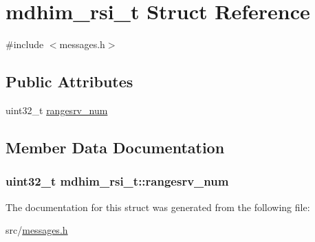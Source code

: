 \hypertarget{structmdhim__rsi__t}{\section{mdhim\-\_\-rsi\-\_\-t Struct Reference}
\label{df/dcf/structmdhim__rsi__t}
}


{\ttfamily \#include $<$messages.\-h$>$}

\subsection*{Public Attributes}
\begin{DoxyCompactItemize}
\item 
uint32\-\_\-t \hyperlink{structmdhim__rsi__t_accbcc2a99c8184df0649f04c01f60baf}{rangesrv\-\_\-num}
\end{DoxyCompactItemize}


\subsection{Member Data Documentation}
\hypertarget{structmdhim__rsi__t_accbcc2a99c8184df0649f04c01f60baf}{
\subsubsection[{rangesrv\-\_\-num}]{\setlength{\rightskip}{0pt plus 5cm}uint32\-\_\-t mdhim\-\_\-rsi\-\_\-t\-::rangesrv\-\_\-num}}\label{df/dcf/structmdhim__rsi__t_accbcc2a99c8184df0649f04c01f60baf}


The documentation for this struct was generated from the following file\-:\begin{DoxyCompactItemize}
\item 
src/\hyperlink{messages_8h}{messages.\-h}\end{DoxyCompactItemize}
